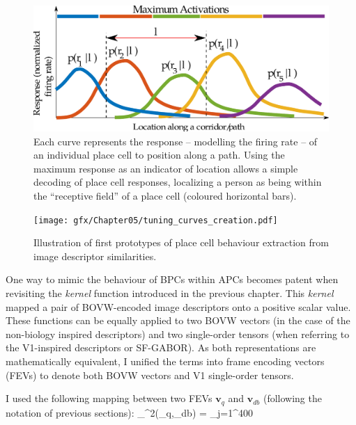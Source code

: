 \begin{figure}
\includegraphics[width=\textwidth]{gfx/Chapter05/APCResponses.pdf}
\caption{Each curve represents the response -- modelling the firing rate -- of an individual place cell to position along a path. Using the maximum response as an indicator of location allows a simple decoding of place cell responses, localizing a person as being within the ``receptive field'' of a place cell (coloured horizontal bars).}
\label{fig:APCresponses}
\end{figure}


\begin{figure}
\texttt{[image: gfx/Chapter05/tuning\_curves\_creation.pdf]}
\caption{Illustration of first prototypes of place cell behaviour extraction from image descriptor similarities.}
\label{fig:creatingAPCs}
\end{figure}


One way to mimic the behaviour of BPCs within APCs becomes patent when revisiting the \textit{kernel} function introduced in the previous chapter. This \textit{kernel} mapped a pair of BOVW-encoded image descriptors onto a positive scalar value. These functions can be equally applied to two BOVW vectors (in the case of the non-biology inspired descriptors) and two single-order tensors (when referring to the V1-inspired descriptors or SF-GABOR). As both representations are mathematically equivalent, I unified the terms into frame encoding vectors (FEVs) to denote both BOVW vectors and V1 single-order tensors.

I used the following mapping between two FEVs $\mathbf{v}_q$ and $\mathbf{v}_{db}$ (following the notation of previous sections):
\be
\kappa_{\chi^2}(_q,_{db}) = \sum_{j=1}^{400}
\ee

